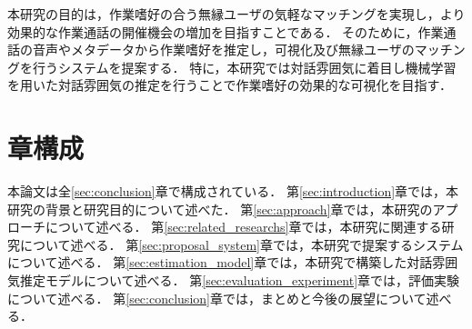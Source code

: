 本研究の目的は，作業嗜好の合う無縁ユーザの気軽なマッチングを実現し，より効果的な作業通話の開催機会の増加を目指すことである．
そのために，作業通話の音声やメタデータから作業嗜好を推定し，可視化及び無縁ユーザのマッチングを行うシステムを提案する．
特に，本研究では対話雰囲気に着目し機械学習を用いた対話雰囲気の推定を行うことで作業嗜好の効果的な可視化を目指す．

\section{章構成}

本論文は全\ref{sec:conclusion}章で構成されている．
第\ref{sec:introduction}章では，本研究の背景と研究目的について述べた．
第\ref{sec:approach}章では，本研究のアプローチについて述べる．
第\ref{sec:related_researchs}章では，本研究に関連する研究について述べる．
第\ref{sec:proposal_system}章では，本研究で提案するシステムについて述べる．
第\ref{sec:estimation_model}章では，本研究で構築した対話雰囲気推定モデルについて述べる．
第\ref{sec:evaluation_experiment}章では，評価実験について述べる．
第\ref{sec:conclusion}章では，まとめと今後の展望について述べる．

